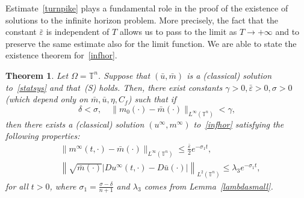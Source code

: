 \documentclass[10pt,a4paper,nouppercase,nowrite]{article}
\numberwithin{equation}{section}
\newcommand{\Sp}{{\textsc (S)} }
\newcommand{\eps}{\varepsilon}
\newcommand{\T}{\mathbb{T}}
\newtheorem{thm}[defn]{Theorem}
\theoremstyle{definition}
\begin{document}
Estimate~\eqref{turnpike} plays a fundamental role in the proof of the existence of solutions to the infinite horizon problem. More precisely, the fact that the constant $\bar \eps$ is independent of $T$ allows us to pass to the limit as $T \to +\infty$ and to preserve the same estimate also for the limit function. We are able to state the existence theorem for~\eqref{infhor}.
\begin{thm} \label{exinfhor}
	Let $\Omega=\T^n$. Suppose that $(\bar u,\bar m)$ is a (classical) solution to~\eqref{statsys} and that~\Sp holds. Then, there exist constants $\gamma > 0, \bar \eps > 0, \sigma > 0$ (which depend only on $\bar m, \bar u, \eta, C_f$) such that if
		\begin{equation*}
		\delta < \sigma, \quad \| m_0(\cdot)-\bar m(\cdot) \|_{L^{\infty}(\T^n)} < \gamma,
	\end{equation*}
	then there exists a (classical) solution $(u^\infty,m^\infty)$ to~\eqref{infhor} satisfying the following properties:
		\begin{align*}
			&\|m^{\infty}(t,\cdot)-\bar m(\cdot)\|_{L^{\infty}(\T^n)} \le \frac{\bar{\eps}}{2} e^{-\sigma_1 t}, \\
			&\left \| \sqrt{\bar m(\cdot)} \left| Du^{\infty}(t,\cdot) - D\bar u(\cdot) \right| \right \|_{L^2(\T^n)} \le \lambda_3 e^{-\sigma_1 t},
		\end{align*}
	for all $t > 0$, where $\sigma_1=\frac{\sigma-\delta}{n+1}$ and $\lambda_3$ comes from Lemma~\ref{lambdasmall}.
\end{thm}
\end{document}
